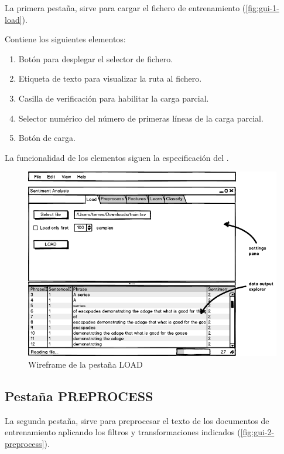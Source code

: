 La primera pestaña,  sirve para cargar el fichero de entrenamiento  (\autoref{fig:gui-1-load}).

Contiene los siguientes elementos:
\begin{enumerate}
\item Botón para desplegar el selector de fichero.
\item Etiqueta de texto para visualizar la ruta al fichero.
\item Casilla de verificación para habilitar la carga parcial.
\item Selector numérico del número de primeras líneas de la carga parcial.
\item Botón de carga.
\end{enumerate}

La funcionalidad de los elementos siguen la especificación del .

\begin{figure}[htbp]
\centering
\includegraphics[width=14cm]{gui-1-load}
\caption{Wireframe de la pestaña LOAD}
\label{fig:gui-1-load}
\end{figure}

\FloatBarrier
\newpage
\subsection{Pestaña PREPROCESS}

La segunda pestaña,  sirve para preprocesar el texto de los documentos de entrenamiento aplicando los filtros y transformaciones indicados (\autoref{fig:gui-2-preprocess}).

